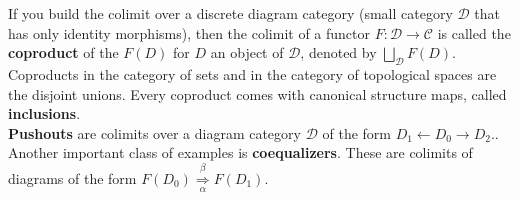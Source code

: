 If you build the colimit over a discrete diagram category (small category $\mathcal{D}$ that has only identity morphisms), then the colimit of a functor $F: \mathcal{D} \rightarrow \mathcal{C}$ is called the \textbf{coproduct} of the $F(D)$ for $D$ an object of $\mathcal{D}$, denoted by
        $
        \bigsqcup_{\mathcal{D}} F(D) .
        $
        Coproducts in the category of sets and in the category of topological spaces are the disjoint unions.
        Every coproduct comes with canonical structure maps, called \textbf{inclusions}.\\
\textbf{Pushouts} are colimits over a diagram category $\mathcal{D}$ of the form
        $
        D_1 \leftarrow D_0 \rightarrow D_2 .
        $.\\
Another important class of examples is \textbf{coequalizers}. These are colimits of diagrams of the form
        $
        F\left(D_0\right) \underset{\alpha}{\stackrel{\beta}{\Longrightarrow}} F\left(D_1\right) .
        $


